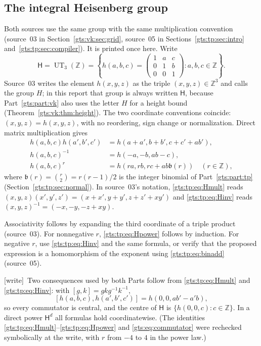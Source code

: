 \documentclass[11pt,letterpaper]{article}
\theoremstyle{definition}
\theoremstyle{remark}
\newcommand{\Z}{\mathbb Z}
\newcommand{\HH}{\mathsf H}
\newcommand{\bn}{\mathfrak b}
\newcommand{\wtag}{\textup{[write]}}
\begin{document}
\subsection{The integral Heisenberg group}\label{gts:sec:heis}

Both sources use the same group with the same multiplication convention (source~03 in Section~\ref{gts:vk:sec:grid}, source~05 in Sections~\ref{gts:tp:sec:intro} and~\ref{gts:tp:sec:compiler}). It is printed once here. Write
\[
 \HH=\operatorname{UT}_3(\Z)
 =\left\{h(a,b,c)=
 \begin{pmatrix}1&a&c\\0&1&b\\0&0&1\end{pmatrix}:a,b,c\in\Z\right\}.
\]
Source~03 writes the element $h(x,y,z)$ as the triple $(x,y,z)\in\Z^3$ and calls the group $H$; in this report that group is always written $\HH$, because Part~\ref{gts:part:vk} also uses the letter $H$ for a height bound (Theorem~\ref{gts:vk:thm:height}). The two coordinate conventions coincide: $(x,y,z)=h(x,y,z)$, with no reordering, sign change or normalization. Direct matrix multiplication gives
\begin{align}
 h(a,b,c)h(a',b',c')
   &=h(a+a',b+b',c+c'+ab'),\label{gts:tp:eq:Hmult}\\
 h(a,b,c)^{-1}&=h(-a,-b,ab-c),\label{gts:tp:eq:Hinv}\\
 h(a,b,c)^r&=h(ra,rb,rc+ab\bn(r))\quad(r\in\Z),
 \label{gts:tp:eq:Hpower}
\end{align}
where $\bn(r)=\binom r2=r(r-1)/2$ is the integer binomial of Part~\ref{gts:part:tp} (Section~\ref{gts:tp:sec:normal}). In source~03's notation, \eqref{gts:tp:eq:Hmult} reads $(x,y,z)(x',y',z')=(x+x',y+y',z+z'+xy')$ and \eqref{gts:tp:eq:Hinv} reads $(x,y,z)^{-1}=(-x,-y,-z+xy)$.

Associativity follows by expanding the third coordinate of a triple product \textup{(source~03)}. For nonnegative $r$, \eqref{gts:tp:eq:Hpower} follows by induction. For negative $r$, use \eqref{gts:tp:eq:Hinv} and the same formula, or verify that the proposed expression is a homomorphism of the exponent using \eqref{gts:tp:eq:binadd} \textup{(source~05)}.

\wtag\ Two consequences used by both Parts follow from \eqref{gts:tp:eq:Hmult} and \eqref{gts:tp:eq:Hinv}: with $[g,k]=gkg^{-1}k^{-1}$,
\begin{equation}\label{gts:eq:commutator}
 [h(a,b,c),h(a',b',c')]=h(0,0,ab'-a'b),
\end{equation}
so every commutator is central, and the centre of $\HH$ is $\{h(0,0,c):c\in\Z\}$. In a direct power $\HH^d$ all formulas hold coordinatewise. (The identities \eqref{gts:tp:eq:Hmult}--\eqref{gts:tp:eq:Hpower} and \eqref{gts:eq:commutator} were rechecked symbolically at the write, with $r$ from $-4$ to $4$ in the power law.)
\end{document}
